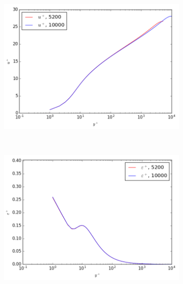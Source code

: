 \documentclass[a4paper,11pt]{article}
\begin{document}
\begin{figure}
	\centering
	\begin{subfigure}[b]{0.45\textwidth} %
		\includegraphics[width=\textwidth]{U_10000}
		\caption{}
		\label{fig:results_U_10000}
	\end{subfigure}
	~
	\begin{subfigure}[b]{0.45\linewidth} %
		\includegraphics[width=\textwidth]{eps_10000}
		\caption{}
		\label{fig:results_k_10000}
	\end{subfigure}
	

\end{figure}
\end{document}
